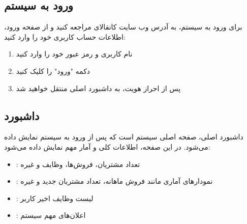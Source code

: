 \documentclass[letterpaper,10pt,english]{sphinxmanual}
\begin{document}
\subsection{ورود به سیستم}
\label{\detokenize{user_guide/index:id3}}
\sphinxAtStartPar
برای ورود به سیستم، به آدرس وب سایت کانقالای مراجعه کنید و از صفحه ورود، اطلاعات حساب کاربری خود را وارد کنید:
\begin{enumerate}
%
\item {} 
\sphinxAtStartPar
نام کاربری و رمز عبور خود را وارد کنید

\item {} 
\sphinxAtStartPar
دکمه "ورود" را کلیک کنید

\item {} 
\sphinxAtStartPar
پس از احراز هویت، به داشبورد اصلی منتقل خواهید شد

\end{enumerate}



\subsection{داشبورد}
\label{\detokenize{user_guide/index:id4}}
\sphinxAtStartPar
داشبورد اصلی، صفحه اصلی سیستم است که پس از ورود به سیستم نمایش داده می‌شود. در این صفحه، اطلاعات کلی و آمار مهم نمایش داده می‌شود:
\begin{itemize}
\item {} 
\sphinxAtStartPar
{}: تعداد مشتریان، فروش‌ها، وظایف و غیره

\item {} 
\sphinxAtStartPar
{}: نمودارهای آماری مانند فروش ماهانه، تعداد مشتریان جدید و غیره

\item {} 
\sphinxAtStartPar
{}: لیست وظایف اخیر کاربر

\item {} 
\sphinxAtStartPar
{}: اعلان‌های مهم سیستم

\end{itemize}
\end{document}
